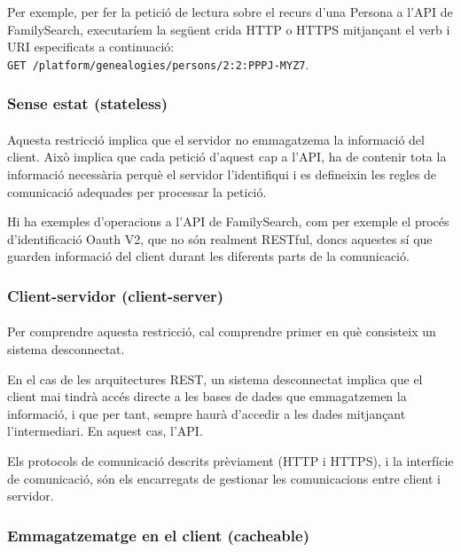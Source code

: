     Per exemple, per fer la petició de lectura sobre el recurs d’una Persona a l’\gls{API} de FamilySearch, executaríem la següent crida \gls{HTTP} o \gls{HTTPS} mitjançant el verb i URI especificats a continuació:\\ \verb|GET /platform/genealogies/persons/2:2:PPPJ-MYZ7|.


    \subsubsection{Sense estat (stateless)}

    \paragraph{}
    Aquesta restricció implica que el servidor no emmagatzema la informació del client. Això implica que cada petició d'aquest cap a l’\gls{API}, ha de contenir tota la informació necessària perquè el servidor l'identifiqui i es defineixin les regles de comunicació adequades per processar la petició.

    Hi ha exemples d'operacions a l'\gls{API} de FamilySearch, com per exemple el procés d'identificació Oauth V2, que no són realment RESTful, doncs aquestes sí que guarden informació del client durant les diferents parts de la comunicació.


    \subsubsection{Client-servidor (client-server)}

    \paragraph{}
    Per comprendre aquesta restricció, cal comprendre primer en què consisteix un sistema desconnectat.

    En el cas de les arquitectures REST, un sistema desconnectat implica que el client mai tindrà accés directe a les bases de dades que emmagatzemen la informació, i que per tant, sempre haurà d'accedir a les dades mitjançant l’intermediari. En aquest cas, l'\gls{API}.

    Els protocols de comunicació descrits prèviament (\gls{HTTP} i \gls{HTTPS}), i la interfície de comunicació, són els encarregats de gestionar les comunicacions entre client i servidor.


    \subsubsection{Emmagatzematge en el client (cacheable)}

